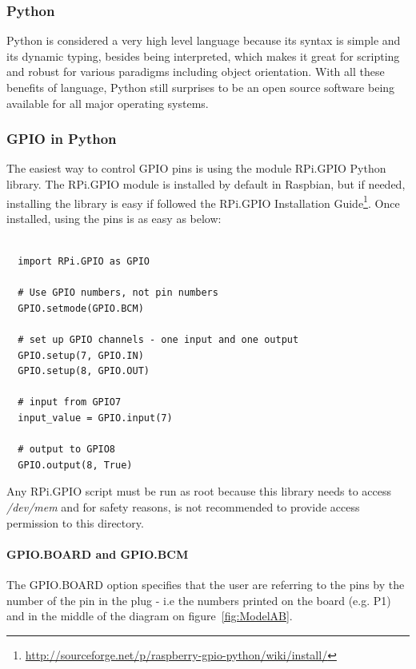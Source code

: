 \documentclass{acm_proc_article-sp}
\begin{document}
\subsubsection{Python}
Python is considered a very high level language because its syntax is simple and its dynamic typing, besides being interpreted, which makes it great for scripting and robust for various paradigms including object orientation. With all these benefits of language, Python still surprises to be an open source software being available for all major operating systems\cite{dearduino}.

\subsubsection{GPIO in Python}
The easiest way to control GPIO pins is using the module RPi.GPIO Python library. The RPi.GPIO module is installed by default in Raspbian, but if needed, installing the library is easy if followed the RPi.GPIO Installation Guide\footnote{\url{http://sourceforge.net/p/raspberry-gpio-python/wiki/install/}}. Once installed, using the pins is as easy as below: 


\renewcommand{\theFancyVerbLine}{
  \sffamily\textcolor[rgb]{0.5,0.5,0.5}{\scriptsize\arabic{FancyVerbLine}}}
\begin{verbatim}

  import RPi.GPIO as GPIO

  # Use GPIO numbers, not pin numbers
  GPIO.setmode(GPIO.BCM) 

  # set up GPIO channels - one input and one output
  GPIO.setup(7, GPIO.IN) 
  GPIO.setup(8, GPIO.OUT)

  # input from GPIO7
  input_value = GPIO.input(7)

  # output to GPIO8
  GPIO.output(8, True)
\end{verbatim}

Any RPi.GPIO script must be run as root because this library needs to access \textit{/dev/mem} and for safety reasons, is not recommended to provide access permission to this directory.


\paragraph{GPIO.BOARD and GPIO.BCM}
The GPIO.BOARD option specifies that the user are referring to the pins by the number of the pin in the plug - i.e the numbers printed on the board (e.g. P1) and in the middle of the diagram on figure~\ref{fig:ModelAB}.
\end{document}
